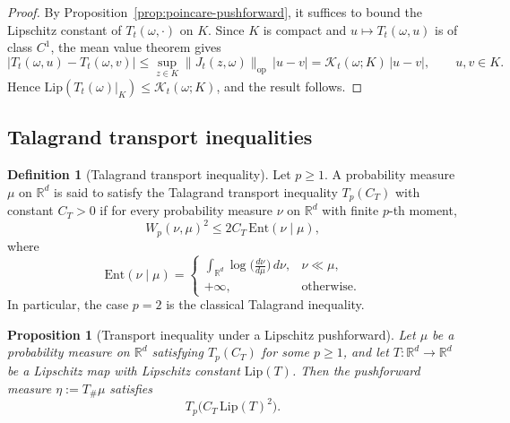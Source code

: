 \documentclass{tsp-short}
\newtheorem{proposition}{Proposition}[section]
\theoremstyle{remark}
\theoremstyle{definition}
\newtheorem{definition}{Definition}[section]
\newcommand{\Ent}{\mathrm{Ent}}
\begin{document}
\begin{proof}
By Proposition~\ref{prop:poincare-pushforward}, it suffices to bound the Lipschitz constant of $T_t(\omega,\cdot)$ on $K$.
Since $K$ is compact and $u\mapsto T_t(\omega,u)$ is of class $C^1$, the mean value theorem gives
\begin{equation*}
|T_t(\omega,u)-T_t(\omega,v)|
\le
\sup_{z\in K}\|J_t(z,\omega)\|_{\mathrm{op}}\,|u-v|
=
\mathcal K_t(\omega;K)\,|u-v|,
\qquad u,v\in K.
\end{equation*}
Hence $\mathrm{Lip}(T_t(\omega)|_K)\le \mathcal K_t(\omega;K)$, and the result follows.
\end{proof}

\subsection{Talagrand transport inequalities}

\begin{definition}[Talagrand transport inequality]
Let $p\ge1$.
A probability measure $\mu$ on $\mathbb{R}^d$ is said to satisfy the Talagrand transport inequality $T_p(C_T)$ with constant $C_T>0$ if for every probability measure $\nu$ on $\mathbb{R}^d$ with finite $p$-th moment,
\begin{equation}
W_p(\nu,\mu)^2 \le 2C_T\,\Ent(\nu\mid \mu),
\label{eq:Tp-def}
\end{equation}
where
\begin{equation*}
\Ent(\nu\mid\mu)=
\begin{cases}
\displaystyle \int_{\mathbb{R}^d}\log\Big(\frac{d\nu}{d\mu}\Big)\,d\nu,& \nu\ll \mu,\\[3mm]
+\infty,& \text{otherwise}.
\end{cases}
\end{equation*}
In particular, the case $p=2$ is the classical Talagrand inequality.
\end{definition}

\begin{proposition}[Transport inequality under a Lipschitz pushforward]\label{prop:talagrand-pushforward}
Let $\mu$ be a probability measure on $\mathbb{R}^d$ satisfying $T_p(C_T)$ for some $p\ge1$, and let
$T:\mathbb{R}^d\to\mathbb{R}^d$ be a Lipschitz map with Lipschitz constant $\mathrm{Lip}(T)$.
Then the pushforward measure $\eta:=T_{\#}\mu$ satisfies
\begin{equation*}
T_p\big(C_T\,\mathrm{Lip}(T)^2\big).
\end{equation*}
\end{proposition}
\end{document}
